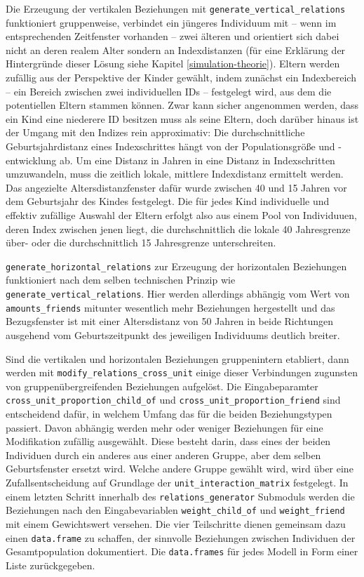 \documentclass[openany,twoside,twocolumn]{book}
\begin{document}
Die Erzeugung der vertikalen Beziehungen mit \texttt{generate\_vertical\_relations} funktioniert gruppenweise, verbindet ein jüngeres Individuum mit -- wenn im entsprechenden Zeitfenster vorhanden -- zwei älteren und orientiert sich dabei nicht an deren realem Alter sondern an Indexdistanzen (für eine Erklärung der Hintergründe dieser Lösung siehe Kapitel \ref{simulation-theorie}). Eltern werden zufällig aus der Perspektive der Kinder gewählt, indem zunächst ein Indexbereich -- ein Bereich zwischen zwei individuellen IDs -- festgelegt wird, aus dem die potentiellen Eltern stammen können. Zwar kann sicher angenommen werden, dass ein Kind eine niederere ID besitzen muss als seine Eltern, doch darüber hinaus ist der Umgang mit den Indizes rein approximativ: Die durchschnittliche Geburtsjahrdistanz eines Indexschrittes hängt von der Populationsgröße und -entwicklung ab. Um eine Distanz in Jahren in eine Distanz in Indexschritten umzuwandeln, muss die zeitlich lokale, mittlere Indexdistanz ermittelt werden. Das angezielte Altersdistanzfenster dafür wurde zwischen 40 und 15 Jahren vor dem Geburtsjahr des Kindes festgelegt. Die für jedes Kind individuelle und effektiv zufällige Auswahl der Eltern erfolgt also aus einem Pool von Individuuen, deren Index zwischen jenen liegt, die durchschnittlich die lokale 40 Jahresgrenze über- oder die durchschnittlich 15 Jahresgrenze unterschreiten.

\texttt{generate\_horizontal\_relations} zur Erzeugung der horizontalen Beziehungen funktioniert nach dem selben technischen Prinzip wie \texttt{generate\_vertical\_relations}. Hier werden allerdings abhängig vom Wert von \texttt{amounts\_friends} mitunter wesentlich mehr Beziehungen hergestellt und das Bezugsfenster ist mit einer Altersdistanz von 50 Jahren in beide Richtungen ausgehend vom Geburtszeitpunkt des jeweiligen Individuums deutlich breiter.

Sind die vertikalen und horizontalen Beziehungen gruppenintern etabliert, dann werden mit \texttt{modify\_relations\_cross\_unit} einige dieser Verbindungen zugunsten von gruppenübergreifenden Beziehungen aufgelöst. Die Eingabeparamter \texttt{cross\_unit\_proportion\_child\_of} und \texttt{cross\_unit\_proportion\_friend} sind entscheidend dafür, in welchem Umfang das für die beiden Beziehungstypen passiert. Davon abhängig werden mehr oder weniger Beziehungen für eine Modifikation zufällig ausgewählt. Diese besteht darin, dass eines der beiden Individuen durch ein anderes aus einer anderen Gruppe, aber dem selben Geburtsfenster ersetzt wird. Welche andere Gruppe gewählt wird, wird über eine Zufallsentscheidung auf Grundlage der \texttt{unit\_interaction\_matrix} festgelegt. In einem letzten Schritt innerhalb des \texttt{relations\_generator} Submoduls werden die Beziehungen nach den Eingabevariablen \texttt{weight\_child\_of} und \texttt{weight\_friend} mit einem Gewichtswert versehen. Die vier Teilschritte dienen gemeinsam dazu einen \texttt{data.frame} zu schaffen, der sinnvolle Beziehungen zwischen Individuen der Gesamtpopulation dokumentiert. Die \texttt{data.frames} für jedes Modell in Form einer Liste zurückgegeben.
\end{document}

